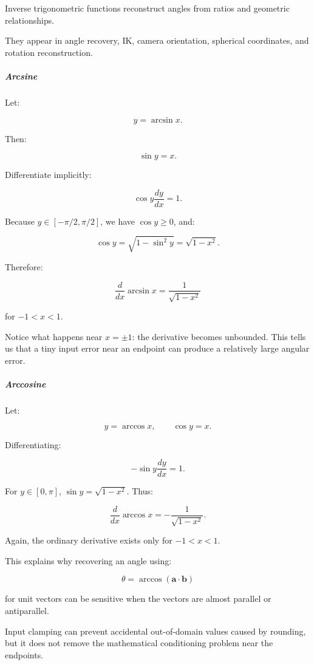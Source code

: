\hypertarget{01-foundations-i-ch020-inverse-trigonometric-differentiation}{}

Inverse trigonometric functions reconstruct angles from ratios and geometric relationships.

They appear in angle recovery, IK, camera orientation, spherical coordinates, and rotation reconstruction.

\subparagraph{Arcsine}\label{01-foundations-i-ch020-arcsine}

\hypertarget{01-foundations-i-ch020-arcsine}{}

Let:

\[
y=\arcsin x.
\]

Then:

\[
\sin y=x.
\]

Differentiate implicitly:

\[
\cos y\frac{dy}{dx}=1.
\]

Because \(y\in[-\pi/2,\pi/2]\), we have \(\cos y\ge0\), and:

\[
\cos y=\sqrt{1-\sin^2y}=\sqrt{1-x^2}.
\]

Therefore:

\[
\boxed{\frac d{dx}\arcsin x=\frac1{\sqrt{1-x^2}}}
\]

for \(-1<x<1\).

Notice what happens near \(x=\pm1\): the derivative becomes unbounded. This tells us that a tiny input error near an endpoint can produce a relatively large angular error.

\subparagraph{Arccosine}\label{01-foundations-i-ch020-arccosine}

\hypertarget{01-foundations-i-ch020-arccosine}{}

Let:

\[
y=\arccos x,\qquad\cos y=x.
\]

Differentiating:

\[
-\sin y\frac{dy}{dx}=1.
\]

For \(y\in[0,\pi]\), \(\sin y=\sqrt{1-x^2}\). Thus:

\[
\boxed{\frac d{dx}\arccos x=-\frac1{\sqrt{1-x^2}}}.
\]

Again, the ordinary derivative exists only for \(-1<x<1\).

This explains why recovering an angle using:

\[
\theta=\arccos(\mathbf a\cdot\mathbf b)
\]

for unit vectors can be sensitive when the vectors are almost parallel or antiparallel.

Input clamping can prevent accidental out-of-domain values caused by rounding, but it does not remove the mathematical conditioning problem near the endpoints.

